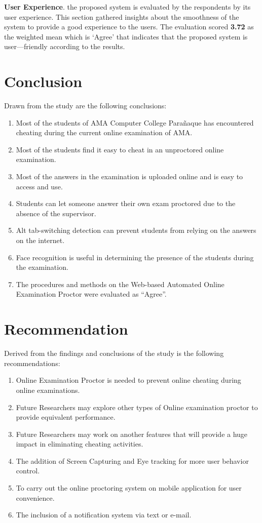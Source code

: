 \textbf{User Experience}.
the proposed system is evaluated by the respondents by its user experience.
This section gathered insights about the smoothness of the system to provide a good experience to the users.
The evaluation scored \textbf{3.72} as the weighted mean which is ‘Agree’ that indicates that the proposed system is user—friendly according to the results.

\section{Conclusion}

Drawn from the study are the following conclusions:

\begin{enumerate}
   \item Most of the students of AMA Computer College Parañaque has encountered cheating during the current online examination of AMA.
   \item Most of the students find it easy to cheat in an unproctored online examination.
   \item Most of the answers in the examination is uploaded online and is easy to access and use.
   \item Students can let someone answer their own exam proctored due to the absence of the supervisor.
   \item Alt tab-switching detection can prevent students from relying on the answers on the internet.
   \item Face recognition is useful in determining the presence of the students during the examination.
   \item The procedures and methods on the Web-based Automated Online Examination Proctor were evaluated as “Agree”.
\end{enumerate}

\section{Recommendation}

Derived from the findings and conclusions of the study is the following recommendations:

\begin{enumerate}
   \item Online Examination Proctor is needed to prevent online cheating during online examinations.
   \item Future Researchers may explore other types of Online examination proctor to provide equivalent performance.
   \item Future Researchers may work on another features that will provide a huge impact in eliminating cheating activities.
   \item The addition of Screen Capturing and Eye tracking for more user behavior control.
   \item To carry out the online proctoring system on mobile application for user convenience.
   \item The inclusion of a notification system via text or e-mail.
\end{enumerate}
